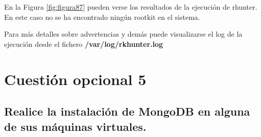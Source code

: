 \begin{itemize}
	 En la Figura \ref{fig:figura87} pueden verse los resultados de la ejecución de rhunter. En este caso no se ha encontrado ningún rootkit en el sistema.
	 
	 Para más detalles sobre advertencias y demás puede visualizarse el log de la ejecución desde el fichero \textbf{/var/log/rkhunter.log}
	 
\end{itemize}

\newpage

\section{Cuestión opcional 5}
\cite{enlace31}
\subsection{Realice la instalación de MongoDB en alguna de sus
	máquinas virtuales.} 

